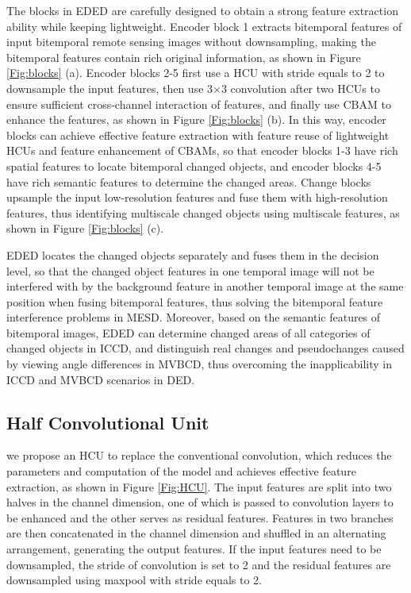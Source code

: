 \documentclass[journal]{IEEEtran}
\begin{document}
The blocks in EDED are carefully designed to obtain a strong feature extraction ability while keeping lightweight. Encoder block 1 extracts bitemporal features of input bitemporal remote sensing images without downsampling, making the bitemporal features contain rich original information, as shown in Figure \ref{Fig:blocks} (a). Encoder blocks 2-5 first use a HCU with stride equals to 2 to downsample the input features, then use 3×3 convolution after two HCUs to ensure sufficient cross-channel interaction of features, and finally use CBAM to enhance the features, as shown in Figure \ref{Fig:blocks} (b). In this way, encoder blocks can achieve effective feature extraction with feature reuse of lightweight HCUs and feature enhancement of CBAMs, so that encoder blocks 1-3 have rich spatial features to locate bitemporal changed objects, and encoder blocks 4-5 have rich semantic features to determine the changed areas. Change blocks upsample the input low-resolution features and fuse them with high-resolution features, thus identifying multiscale changed objects using multiscale features, as shown in Figure \ref{Fig:blocks} (c).

EDED locates the changed objects separately and fuses them in the decision level, so that the changed object features in one temporal image will not be interfered with by the background feature in another temporal image at the same position when fusing bitemporal features, thus solving the bitemporal feature interference problems in MESD. Moreover, based on the semantic features of bitemporal images, EDED can determine changed areas of all categories of changed objects in ICCD, and distinguish real changes and pseudochanges caused by viewing angle differences in MVBCD, thus overcoming the inapplicability in ICCD and MVBCD scenarios in DED.

\subsection{Half Convolutional Unit}
\label{section:3.3}

we propose an HCU to replace the conventional convolution, which reduces the parameters and computation of the model and achieves effective feature extraction, as shown in Figure \ref{Fig:HCU}. The input features are split into two halves in the channel dimension, one of which is passed to convolution layers to be enhanced and the other serves as residual features. Features in two branches are then concatenated in the channel dimension and shuffled in an alternating arrangement, generating the output features. If the input features need to be downsampled, the stride of convolution is set to 2 and the residual features are downsampled using maxpool with stride equals to 2.
\end{document}
